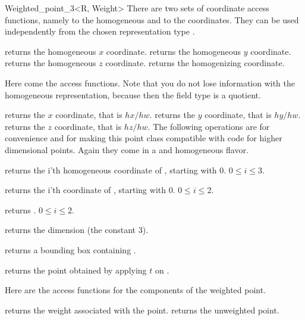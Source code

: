 \begin{ccRefClass} {Weighted_point_3<R, Weight>}
There are two sets of coordinate access functions, namely to the
homogeneous and to the  coordinates. They can be used
independently from the chosen representation type .

       {returns the homogeneous $x$ coordinate.}
\ccGlue
{}
       {returns the homogeneous $y$ coordinate.}
\ccGlue
{}
       {returns the homogeneous $z$ coordinate.}
\ccGlue
{}
       {returns the homogenizing  coordinate.}

Here come the  access functions. Note that you do not 
lose information with the homogeneous representation, because then the field
type is a quotient.

       {returns the  $x$ coordinate, that is $hx/hw$.}
\ccGlue
{}
       {returns the  $y$ coordinate, that is $hy/hw$.}
\ccGlue
{}
       {returns the  $z$ coordinate, that is $hz/hw$.}
The following operations are for convenience and for making this
point class compatible with code for higher dimensional points.
Again they come in a  and homogeneous flavor.

       {returns the i'th homogeneous coordinate of \ccVar, starting with 0.
        \ccPrecond $0\leq i \leq 3$.}

       {returns the i'th  coordinate of \ccVar, starting with 0.
        \ccPrecond $0\leq i \leq 2$.}

       {returns .
        \ccPrecond $0\leq i \leq 2$.}

       {returns the dimension (the constant 3).}

       {returns a bounding box containing \ccVar.}

       {returns the point obtained by applying $t$ on \ccVar.}

Here are the access functions for the components of the weighted point.

       {returns the weight associated with the point.}
\ccGlue
{}
       {returns the unweighted point.}


\end{ccRefClass}
